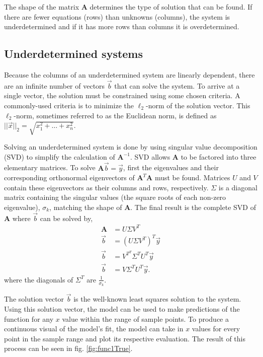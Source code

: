 The shape of the matrix $\mathbf{A}$ determines the type of solution that can be found.  If there are fewer equations (rows) than unknowns (columns), the system is underdetermined and if it has more rows than columns it is overdetermined.  


\subsection{Underdetermined systems}
Because the columns of an underdetermined system are linearly dependent, there are an infinite number of vectors $\vec{b}$ that can solve the system.  To arrive at a single vector, the solution must be constrained using some chosen criteria.  A commonly-used criteria is to minimize the $\ell_2$-norm of the solution vector. This $\ell_2$-norm, sometimes referred to as the Euclidean norm, is defined as $||\vec{x}||_2=\sqrt{x_1^2+\ldots+x_n^2}$.

\par Solving an underdetermined system is done by using singular value decomposition (SVD) to simplify the calculation of $\mathbf{A}^{-1}$. SVD allows $\mathbf{A}$ to be factored into three elementary matrices. To solve $\mathbf{A}\vec{b}=\vec{y}$, first the eigenvalues and their corresponding orthonormal eigenvectors of $\mathbf{A}^T\mathbf{A}$ must be found. Matrices $U$ and $V$ contain these eigenvectors as their columns and rows, respectively. $\Sigma$ is a diagonal matrix containing the singular values (the square roots of each non-zero eigenvalue), $\sigma_k$, matching the shape of $\mathbf{A}$. The final result is the complete SVD of $\mathbf{A}$ where $\vec{b}$ can be solved by,
\begin{align}
\mathbf{A} &= U\Sigma V^T \nonumber \\
\vec{b} &= (U\Sigma V^T)^T\vec{y} \nonumber \\
\vec{b} &= V^{T^T}\Sigma^TU^T\vec{y} \nonumber \\
\vec{b} &= V\Sigma^TU^T\vec{y}.\nonumber 
\end{align}
where the diagonals of $\Sigma^T$ are $\frac{1}{\sigma_k}$.

\par The solution vector $\vec{b}$ is the well-known least squares solution to the system. Using this solution vector, the model can be used to make predictions of the function for any $x$ value within the range of sample points. To produce a continuous visual of the model's fit, the model can take in $x$ values for every point in the sample range and plot its respective evaluation. The result of this process can be seen in fig. \ref{fig:func1True}.

